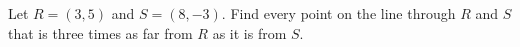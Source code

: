 Let $R=(3,5)$ and $S=(8,-3)$. Find every point on the line through $R$ and $S$ that is three times as far from $R$ as it is from $S$.
